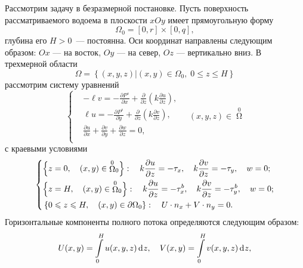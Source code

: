 \documentclass[press]{vestnik}
\begin{document}
Рассмотрим задачу в безразмерной постановке. Пусть поверхность 
рассматриваемого водоема в плоскости $xOy$ имеет прямоугольную форму
\begin{equation}
\label{eq1}
\Omega_{0} =\left[ {0,r} \right]\times \left[ {0,q} \right],
\end{equation}
глубина его $H>0$~--- постоянна. Оси координат направлены следующим образом: $Ox$ 
--- на восток, $Oy$ --- на север, $Oz$ --- вертикально вниз. В трехмерной области 
\begin{equation}
\label{eq2}
\Omega =\left\{ {\left( {x,y,z} \right)\vert \left( {x,y} \right)\in \Omega 
_{0} ,\;0\leqslant  z\leqslant  H} \right\}
\end{equation}
рассмотрим систему уравнений
\begin{equation}
\label{eq3}
\left\{ \begin{aligned}
 &-\ell v=-\frac{\partial P^{s}}{\partial x}+\frac{\partial }{\partial 
z}\left( {k\frac{\partial u}{\partial z}} \right), \\ 
 &\ell u=-\frac{\partial P^{s}}{\partial y}+\frac{\partial }{\partial 
z}\left( {k\frac{\partial v}{\partial z}} \right), \\ 
 &\frac{\partial u}{\partial x}+\frac{\partial v}{\partial y}+\frac{\partial 
w}{\partial z}=0, \\ 
 \end{aligned} \right.\quad\left( {x,y,z} \right)\in \mathop{\Omega}\limits^{0} 
\end{equation}
с краевыми условиями
\begin{equation}
\label{eq4}
\left\{ \begin{aligned}
 &\Bigl\{ z=0,\quad \left( x,y \right) \in {\mathop{\Omega}\limits^0}_0 \Bigr\}:\quad k\frac{\partial u}{\partial z}=-\tau_{x},\quad k\frac{\partial v}{\partial z}=-\tau_{y} ,\quad w=0; \\ 
 &\Bigl\{ z=H,\quad \left( x,y \right)\in {\mathop{\Omega}\limits^0}_0 \Bigr\}:\quad k\frac{\partial u}{\partial z}=-\tau_{x}^{b} ,\quad k\frac{\partial v}{\partial z}=-\tau_{y}^{b} ,\quad w=0; \\ 
 &\left\{ 0\leqslant z\leqslant H,\quad \left( {x,y} \right)\in \partial \Omega_{0}  
\right\}:\quad U\cdot n_{x} +V\cdot n_{y} =0. 
 \end{aligned} \right.
\end{equation}
Горизонтальные компоненты полного потока определяются следующим образом: 
\begin{equation}
\label{eq5}
U(x,y)=\int\limits_0^H {u(x,y,z)\d z} ,\quad V(x,y)=\int\limits_0^H 
{v(x,y,z)\d z} ,
\end{equation}
\end{document}
